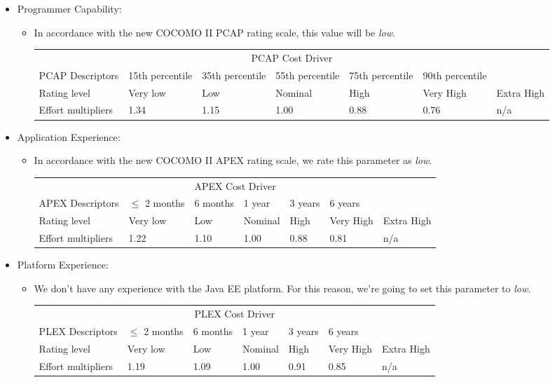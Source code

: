 \documentclass[english]{article}
\newenvironment{costdriverstable}[1]{
	\setlength{\LTleft}{-40pt}
	\begin{longtable}{|p{\dimexpr.16\textwidth}|p{\dimexpr.14\textwidth}|p{\dimexpr.14\textwidth}|p{\dimexpr.14\textwidth}|p{\dimexpr.14\textwidth}|p{\dimexpr.14\textwidth}|p{\dimexpr.14\textwidth}|}
	\hline
	\multicolumn{7}{|c|}{{#1}}\\\hhline{|=======|}
}{
	\hline\end{longtable}
}
\newcommand{\costdescriptors}[7]{
	#1 & #2 & #3 & #4 & #5 & #6 & #7\\
}
\newcommand{\ratinglevel}[6]{
	Rating level & #1 & #2 & #3 & #4 & #5 & #6 \\\hline
}
\newcommand{\effortmultipliers}[6]{
	Effort multipliers & #1 & #2 & #3 & #4 & #5 & #6 \\\hline
}
\begin{document}
\begin{itemize}
	\item Programmer Capability: 
	\begin{itemize}
	\item[]  In accordance with the new COCOMO II PCAP rating scale, this value will be \textit{low}.
	\begin{costdriverstable}{PCAP Cost Driver}
		\costdescriptors{PCAP Descriptors}{15th percentile}{35th percentile}{55th percentile}{75th percentile}{90th percentile}{}\hline
		\ratinglevel{Very low}{Low}{Nominal}{High}{Very High}{Extra High}
		\effortmultipliers{1.34}{1.15}{1.00}{0.88}{0.76}{n/a}	
	\end{costdriverstable}
	\end{itemize}
\end{itemize}

\begin{itemize}
	\item Application Experience: 
	\begin{itemize}
	\item[]  In accordance with the new COCOMO II APEX rating scale, we rate this parameter as \textit{low}.
	\begin{costdriverstable}{APEX Cost Driver}
		\costdescriptors{APEX Descriptors}{$\le$ 2 months}{6 months}{1 year}{3 years}{6 years}{}\hline
		\ratinglevel{Very low}{Low}{Nominal}{High}{Very High}{Extra High}
		\effortmultipliers{1.22}{1.10}{1.00}{0.88}{0.81}{n/a}
	\end{costdriverstable}
	\end{itemize}
\end{itemize}

\begin{itemize}
	\item Platform Experience: 
	\begin{itemize}
	\item[] We don't have any experience with the Java EE platform. For this reason, we're going to set this parameter to \textit{low}.
	\begin{costdriverstable}{PLEX Cost Driver}
		\costdescriptors{PLEX Descriptors}{$\le$ 2 months}{6 months}{1 year}{3 years}{6 years}{}\hline
		\ratinglevel{Very low}{Low}{Nominal}{High}{Very High}{Extra High}
		\effortmultipliers{1.19}{1.09}{1.00}{0.91}{0.85}{n/a}
	\end{costdriverstable}
	\end{itemize}
\end{itemize}
\end{document}
